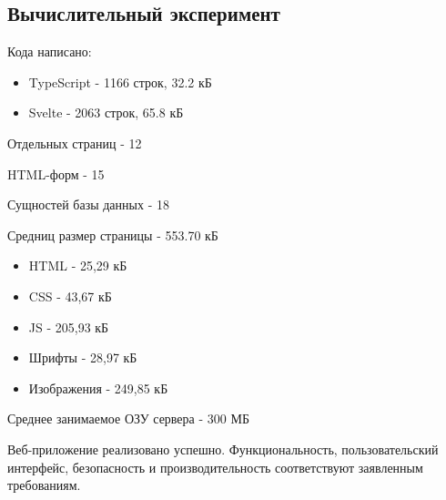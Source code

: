 \documentclass[../document.tex]{subfiles}
\begin{document}
\subsection{Вычислительный эксперимент}
\par Кода написано:
\begin{itemize}
  \item TypeScript - 1166 строк, 32.2 кБ
  \item Svelte - 2063 строк, 65.8 кБ
\end{itemize}
\par Отдельных страниц - 12
\par HTML-форм - 15
\par Сущностей базы данных - 18
\par Средниц размер страницы - 553.70 кБ
\begin{itemize}
  \item HTML - 25,29 кБ
  \item CSS - 43,67 кБ
  \item JS - 205,93 кБ 
  \item Шрифты - 28,97 кБ 
  \item Изображения - 249,85 кБ
\end{itemize}
\par Среднее занимаемое ОЗУ сервера - 300 МБ
\\
\par Веб-приложение реализовано успешно. Функциональность, пользовательский интерфейс, безопасность и производительность соответствуют заявленным требованиям.
\end{document}
